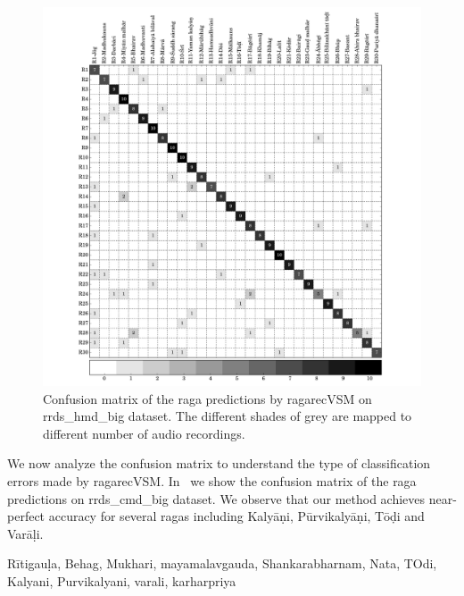 \begin{figure}[h]
	\begin{center}
		\includegraphics[width=\figSizeNinety]{ch07_ragaRecognition/figures/CM_vsm_hmd_var1.pdf}
	\end{center}
	\caption{Confusion matrix of the \gls{raga} predictions by \acrshort{ragarecVSM} on \acrshort{rrds_hmd_big} dataset. The different shades of grey are mapped to different number of audio recordings.}
	\label{fig:confusion_matrix_hmd}
\end{figure}

We now analyze the confusion matrix to understand the type of classification errors made by \acrshort{ragarecVSM}. In~ we show the confusion matrix of the \gls{raga} predictions on \acrshort{rrds_cmd_big} dataset. We observe that our method achieves near-perfect accuracy for several \glspl{raga} including Kaly\={a}\d{n}i, P\={u}rvikaly\={a}\d{n}i, T\={o}\d{d}i and Var\={a}\d{l}i. 

R\={i}tigau\d{l}a, Behag, Mukhari, mayamalavgauda, Shankarabharnam, Nata, TOdi, Kalyani, Purvikalyani, varali, karharpriya

